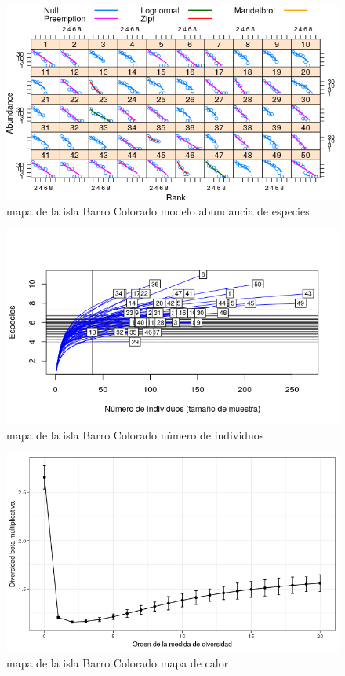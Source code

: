 \documentclass[11pt,]{article}
\begin{document}
\begin{figure}
\centering
\includegraphics[width=1.00000\textwidth]{modelo_abundancia_especie.png}
\caption{mapa de la isla Barro Colorado modelo abundancia de especies
\label{fig:bci_map}}
\end{figure}

\begin{figure}
\centering
\includegraphics[width=1.00000\textwidth]{Numero_individuos.png}
\caption{mapa de la isla Barro Colorado número de individuos
\label{fig:bci_map}}
\end{figure}

\begin{figure}
\centering
\includegraphics[width=1.00000\textwidth]{diversidad_beta.png}
\caption{mapa de la isla Barro Colorado mapa de calor
\label{fig:bci_map}}
\end{figure}
\end{document}

